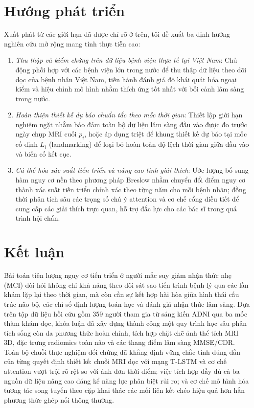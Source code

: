 \section{Hướng phát triển}
Xuất phát từ các giới hạn đã được chỉ rõ ở trên, tôi đề xuất ba định hướng nghiên cứu mở rộng mang tính thực tiễn cao:
\begin{enumerate}[itemsep=0.15em,topsep=0.25em]
\item \emph{Thu thập và kiểm chứng trên dữ liệu bệnh viện thực tế tại Việt Nam}: Chủ động phối hợp với các bệnh viện lớn trong nước để thu thập dữ liệu theo dõi dọc của bệnh nhân Việt Nam, tiến hành đánh giá độ khái quát hóa ngoại kiểm và hiệu chỉnh mô hình nhằm thích ứng tốt nhất với bối cảnh lâm sàng trong nước.
\item \emph{Hoàn thiện thiết kế dự báo chuẩn tắc theo mốc thời gian}: Thiết lập giới hạn nghiêm ngặt nhằm bảo đảm toàn bộ dữ liệu lâm sàng đầu vào được đo trước ngày chụp MRI cuối $p_i$, hoặc áp dụng triệt để khung thiết kế dự báo tại mốc cố định $L_i$ (landmarking) \cite{vanhouwelingen2007dynamic} để loại bỏ hoàn toàn độ lệch thời gian giữa đầu vào và biến cố kết cục.
\item \emph{Cá thể hóa xác suất tiến triển và nâng cao tính giải thích}: Ước lượng bổ sung hàm nguy cơ nền theo phương pháp Breslow \cite{kvamme2019time} nhằm chuyển đổi điểm nguy cơ thành xác suất tiến triển chính xác theo từng năm cho mỗi bệnh nhân; đồng thời phân tích sâu các trọng số chú ý attention và cơ chế cổng điều tiết để cung cấp các giải thích trực quan, hỗ trợ đắc lực cho các bác sĩ trong quá trình hội chẩn.
\end{enumerate}

\section{Kết luận}
Bài toán tiên lượng nguy cơ tiến triển ở người mắc suy giảm nhận thức nhẹ (MCI) đòi hỏi không chỉ khả năng theo dõi sát sao tiến trình bệnh lý qua các lần khám lặp lại theo thời gian, mà còn cần sự kết hợp hài hòa giữa hình thái cấu trúc não bộ, các chỉ số định lượng toán học và đánh giá nhận thức lâm sàng. Dựa trên tập dữ liệu hồi cứu gồm 359 người tham gia từ sáng kiến ADNI qua ba mốc thăm khám dọc, khóa luận đã xây dựng thành công một quy trình học sâu phân tích sống còn đa phương thức hoàn chỉnh, tích hợp chặt chẽ ảnh thể tích MRI 3D, đặc trưng radiomics toàn não và các thang điểm lâm sàng MMSE/CDR. Toàn bộ chuỗi thực nghiệm đối chứng đã khẳng định vững chắc tính đúng đắn của từng quyết định thiết kế: chuỗi MRI dọc với mạng T-LSTM và cơ chế attention vượt trội rõ rệt so với ảnh đơn thời điểm; việc tích hợp đầy đủ cả ba nguồn dữ liệu nâng cao đáng kể năng lực phân biệt rủi ro; và cơ chế mô hình hóa tương tác song tuyến theo cặp khai thác các mối liên kết chéo hiệu quả hơn hẳn phương thức ghép nối thông thường.


